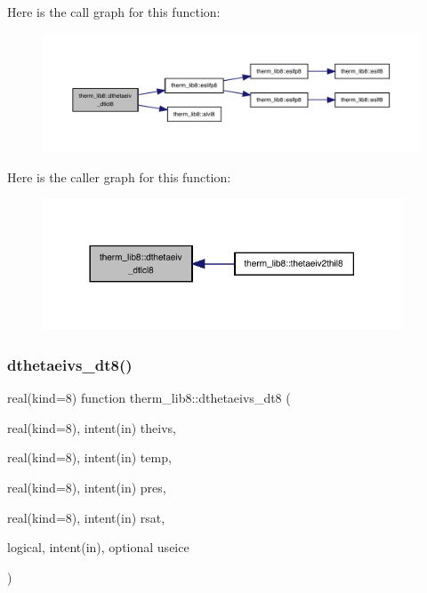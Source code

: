 Here is the call graph for this function\+:
\nopagebreak
\begin{figure}[H]
\begin{center}
\leavevmode
\includegraphics[width=350pt]{namespacetherm__lib8_ac2831ca558c25b3522c21e3cab5ce230_cgraph}
\end{center}
\end{figure}
Here is the caller graph for this function\+:
\nopagebreak
\begin{figure}[H]
\begin{center}
\leavevmode
\includegraphics[width=302pt]{namespacetherm__lib8_ac2831ca558c25b3522c21e3cab5ce230_icgraph}
\end{center}
\end{figure}
\mbox{\label{namespacetherm__lib8_a6f2144435a34b9e51e60dcab30877216}} 
\subsubsection{\texorpdfstring{dthetaeivs\+\_\+dt8()}{dthetaeivs\_dt8()}}
{\footnotesize\ttfamily real(kind=8) function therm\+\_\+lib8\+::dthetaeivs\+\_\+dt8 (\begin{DoxyParamCaption}\item[{real(kind=8), intent(in)}]{theivs,  }\item[{real(kind=8), intent(in)}]{temp,  }\item[{real(kind=8), intent(in)}]{pres,  }\item[{real(kind=8), intent(in)}]{rsat,  }\item[{logical, intent(in), optional}]{useice }\end{DoxyParamCaption})}

